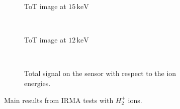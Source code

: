\begin{figure}[!ht]
	\begin{subfigure}[t]{0.25\textwidth}
		
		\caption{ToT image at $15\,\mathrm{keV}$}
		\label{}
	\end{subfigure}
	~
	\begin{subfigure}[t]{0.25\textwidth}
		
		\caption{ToT image at $12\,\mathrm{keV}$}
		\label{}
  \end{subfigure}
  ~
  \begin{subfigure}[t]{0.5\textwidth}
		
		\caption{Total signal on the sensor with respect to the ion energies.}
		\label{}
  \end{subfigure}
	\caption[Main results from IRMA tests with $H_{2}^{+}$ ions]{Main results from IRMA tests with $H_{2}^{+}$ ions.}
	\label{chap4:IRMA_Si}
\end{figure}